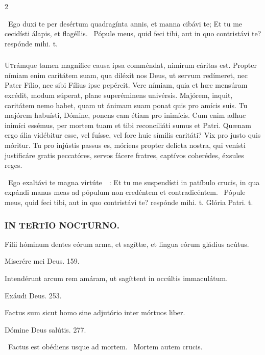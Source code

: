 \documentclass[9pt,twoside]{extarticle}
\begin{document}
\begin{multicols}{2}
{{\begin{tightlist}{}
\item {}~Ego duxi te per desértum quadragínta annis, et manna cibávi te; \textred{*} Et tu me cecidísti álapis, et flagéllis. ~Pópule meus, quid feci tibi, aut in quo contristávi te? respónde mihi. t.
\end{tightlist}

\subsubsection*{\center {}}
\lettrine{U}trámque tamen magnífice causa ipsa comméndat, nimírum cáritas est. Propter nímiam enim caritátem suam, qua diléxit nos Deus, ut servum redímeret, nec Pater Fílio, nec sibi Fílius ipse pepércit. Vere nímiam, quia et hæc mensúram excédit, modum súperat, plane superéminens univérsis. Majórem, inquit, caritátem nemo habet, quam ut ánimam suam ponat quis pro amícis suis. Tu majórem habuísti, Dómine, ponens eam étiam pro inimícis. Cum enim adhuc inimíci essémus, per mortem tuam et tibi reconciliáti sumus et Patri. Quænam ergo ália vidébitur esse, vel fuísse, vel fore huic símilis caritáti? Vix pro justo quis móritur. Tu pro injústis passus es, móriens propter delícta nostra, qui venísti justificáre gratis peccatóres, servos fácere fratres, captívos coherédes, éxsules reges.

\begin{tightlist}{}
\item {}~Ego exaltávi te magna virtúte~~: \textred{*} Et tu me suspendísti in patíbulo crucis, in qua expándi manus meas ad pópulum non credéntem et contradicéntem. ~Pópule meus, quid feci tibi, aut in quo contristávi te? respónde mihi. t. Glória Patri. t.
\end{tightlist}

\subsubsection*{\center \textsc{IN TERTIO NOCTURNO.}}
\begin{tightlist}{}
\item {} Fílii hóminum dentes eórum arma, et sagíttæ, et lingua eórum gládius acútus.
\item {} Miserére mei Deus. 159.
\item {} Intendérunt arcum rem amáram, ut sagíttent in occúltis immaculátum.
\item {} Exáudi Deus. 253.
\item {} Factus sum sicut homo sine adjutório inter mórtuos liber.
\item {} Dómine Deus salútis. 277.
\item {}~Factus est obédiens usque ad mortem. ~Mortem autem crucis.
\end{tightlist}

}}
\end{multicols}
\end{document}
